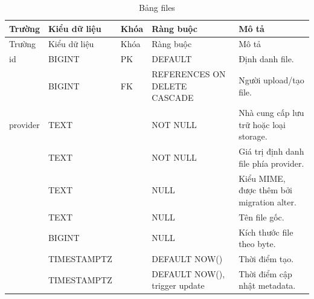 \documentclass[12pt,a4paper]{report}
\begin{document}
\begin{longtable}{L{2.35cm} L{2.1cm} L{1.15cm} L{3.25cm} L{4.85cm}}
\caption{Bảng files}\label{tab:db-files}\\
\toprule
Trường & Kiểu dữ liệu & Khóa & Ràng buộc & Mô tả \\
\midrule
\endfirsthead\toprule Trường & Kiểu dữ liệu & Khóa & Ràng buộc & Mô tả \\\midrule\endhead
id & BIGINT & PK & DEFAULT  & Định danh file. \\
 & BIGINT & FK & REFERENCES  ON DELETE CASCADE & Người upload/tạo file. \\
provider & TEXT & & NOT NULL & Nhà cung cấp lưu trữ hoặc loại storage. \\
 & TEXT & & NOT NULL & Giá trị định danh file phía provider. \\
 & TEXT & & NULL & Kiểu MIME, được thêm bởi migration alter. \\
 & TEXT & & NULL & Tên file gốc. \\
 & BIGINT & & NULL & Kích thước file theo byte. \\
 & TIMESTAMPTZ & & DEFAULT NOW() & Thời điểm tạo. \\
 & TIMESTAMPTZ & & DEFAULT NOW(), trigger update & Thời điểm cập nhật metadata. \\

\bottomrule
\end{longtable}
\end{document}
